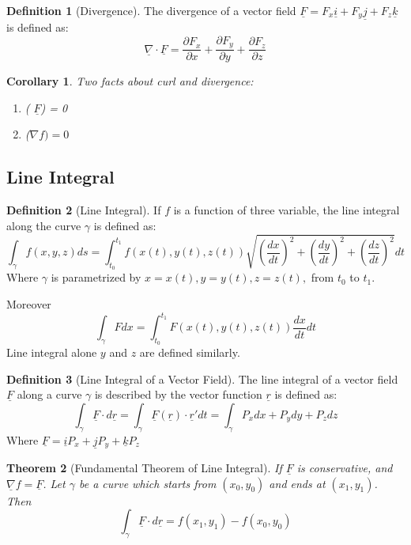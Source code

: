 \documentclass[12pt,a4paper]{article}
\newtheorem{theorem}{Theorem}[subsection]
\newtheorem{corollary}[theorem]{Corollary}
\theoremstyle{definition}
\newtheorem{definition}{Definition}[section]
\theoremstyle{remark}
\begin{document}
\begin{definition}[Divergence]
The divergence of a vector field $\underline{F} = F_x \underline{i} +  F_y \underline{j} + F_z \underline{k}$ is defined as:
\[
	\underline{\nabla} \cdot \underline{F} = \frac{\partial F_x}{\partial x} + \frac{\partial F_y}{\partial y} + \frac{\partial F_z}{\partial z}
\]
\end{definition}

\begin{corollary}
	Two facts about curl and divergence:
	\begin{enumerate}
		\item {} ( $\underline{F}$) = 0
		\item {} ($\nabla f) = 0$
	\end{enumerate}
\end{corollary}
\subsection{Line Integral}
\begin{definition}[Line Integral]

If $f$ is a function of three variable, the line integral along the curve $\gamma$ is defined as:
\[
	\int_\gamma f(x,y,z) ds 
	= \int_{t_0} ^{t_1} f(x(t), y(t), z(t)) \sqrt{ \left(\frac{dx}{dt}\right)^2 + \left(\frac{dy}{dt}\right)^2 + \left(\frac{dz}{dt}\right)^2 } dt
\]
Where $\gamma$ is parametrized by $x=x(t), y=y(t), z=z(t),$ from $t_0$ to $t_1$.

Moreover
\[
	\int_\gamma F dx = \int_{t_0} ^{t_1} F(x(t), y(t), z(t)) \frac{dx}{dt} dt
\]
Line integral alone $y$ and $z$ are defined similarly.

\end{definition}


\begin{definition}[Line Integral of a Vector Field]
	The line integral of a vector field $\underline{F}$ along a curve $\gamma$ is described by the vector function $ \underline{r}$ is defined as:
\[
	\int_\gamma \underline{F} \cdot d\underline{r} 
	=	 \int_{\gamma} \underline{F} (\underline{r}) \cdot \underline{r}'dt
	= \int_{\gamma} P_x dx + P_y dy + P_z dz
\]
Where $ \underline{F} = \underline{i} P_x + \underline{j} P_y +  \underline{k} P_z$
\end{definition}

\begin{theorem}[Fundamental Theorem of Line Integral]
If $\underline{F}$ is conservative, and $ \underline{\nabla}f = \underline{F}$. 
Let $\gamma$ be a curve which starts from $(x_0, y_0)$ and ends at $(x_1, y_1)$.
Then
\[
\int _\gamma \underline{F} \cdot d\underline{r} = f(x_1, y_1) - f(x_0, y_0)
\]

\end{theorem}
\end{document}
